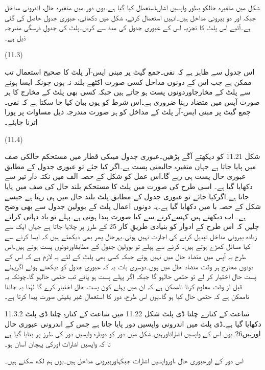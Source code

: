 	شکل میں متغیرہ حالکو بطور واپسیں اشارہاستعمال کیا گیا ہے۔یوں دور میں متغیرہ حال، اندرونی مداخل جبکہ اور  دو بیرونی مداخل ہیں۔انہیں استعمال کرتے، شکل میں دکھائی، عبوری جدول حاصل کی گئی ہے۔آئیے اس پلٹ کا تجزیہ اس کے عبوری جدول کی مدد سے کریں۔پلٹ کی جدولِ درسگی مندرجہ ذیل ہے۔

 
(11.3)

	اس جدول سے ظاہر ہے کہ نفی۔جمع گیٹ پر مبنی ایس-آر پلٹ کا صحیح استعمال تب ممکن ہے جب اس کے دونوں مداخل کسی صورت اکٹھے بلند نہ ہوں چونکہ ایسا ہونے سے پلٹ کے مخارجاوردونوں پست ہو جاتے ہیں جبکہ کسی بھی پلٹ کے مخارج کا ہر صورت آپس میں متضاد رہنا ضروری ہے۔اس شرط کو یوں بیان کیا جا سکتا ہے کہ نفی۔جمع گیٹ پر مبنی ایس-آر پلٹ کے مداخل کو ہر صورت مندرجہ ذیل مساوات پر پورا اترنا چاہئے۔

 
(11.4)
 
	شکل 11.21 کو دیکھتے آگے پڑھیں۔عبوری جدول میںکی قطار میں مستحکم حالکی صف میں پایا جاتا ہے جہاں متغیرہ حالیعنی پست ہے۔اگر کیا جئے تو عبوری جدول کے مطابق عبوری حال  پست ہی رہے گا۔اس عمل کو شکل کے حصہ الف میں نکتہ دار تیر سے دکھایا گیا ہے۔
	اسی طرح  کی صورت میں پلٹ کا مستحکم بلند حال  کی صف میں پایا جاتا ہے۔اگرکیا جائے تو عبوری جدول کے مطابق پلٹ بلند حال میں ہی رہتا ہے جیسے شکل کے حصہ با میں دکھایا گیا ہے۔یہ دونوں اعمال پلٹ کے بوولین جدول سے بھی وضح ہے۔
	اب دیکھتے ہیں کہسےکرنے سے کیا صورت پیدا ہوتی ہے۔پہلے تو یاد دہانی کراتے چلیں کہ اس طرح کے ادوار کو بنیادی طریقِ کار 25 کے طرز پر چلایا جاتا ہے جہاں ایک سے زیادہ بیرونی مداخل تبدیل کرنے کی اجازت نہیں ہوتی۔بہرحال پھر بھی دیکھتے ہیں کہ ایسا کرنے سے کیا مسائل کھڑے ہوتے ہیں۔
	کرنے سے پہلے تو بوولین جدول کے مطابقاوردونوں پست ہوتے ہیں۔اس طرح یہ آپس میں متضاد حال میں نہیں ہوتے جبکہ کسی بھی پلٹ کے لئے یہ لازم ہے کہ اس کے دونوں مخارج ہر وقت متضاد حال میں ہوں۔دوسری بات یہ کہ عبوری جدول کو دیکھتے ہوئے اگرپہلے پست حال اختیار کر لے تو حتمی حالہو گا جبکہ اگر پہلے پست ہو پائے تب حتمی حالہو گا۔چونکہ یہ قبل از وقت معلوم کرنا ناممکن ہے کہ ان میں پہلے کون پست حال اختیار کرے گا لہٰذا یہ جاننا ناممکن ہے کہ حتمی حال کیا ہو گا۔یوں اس طرح، دور کا استعمال غیر یقینی صورت پیدا کرتا ہے۔

11.3.2 ساعت کے کنارے چلتا ڈی پلٹ
	شکل 11.22 میں ساعت کے کنارہ چلتا ڈی پلٹ دکھایا گیا ہے۔ڈی پلٹ میں اندرونی واپسیں دور پایا جاتا ہے جس کے اندرونی عبوری حال اورہیں26۔یوں اس کے واپسیں اشاراتاورہیں۔شکل میں دور کو دوبارہ واپسیں دور کی طرز پر بنایا گیا ہے تا کہ واپسیں اشارات اورکی پہچان آسان ہو۔



	اس دور کے اورعبوری حال ،اورواپسیں اشارات  جبکہاوربیرونی مداخل ہیں۔یوں ہم لکھ سکتے ہیں۔

